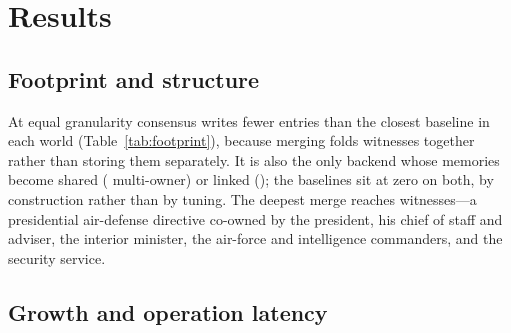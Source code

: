 \documentclass{article}
\begin{document}
\section{Results}

\subsection{Footprint and structure}
\label{sec:structure}

\begin{table}[t]
\centering
\caption{Store size by backend and world. ``Sediment'' is the store at round~0, produced by each mechanism's own ingest of the identical source events --- one row per event under consensus, one row per witness under every baseline, plus each backend's own by-products (Generative-Agents reflections, G-Memory insight nodes). ``Sim'' is what the simulation then added and is the comparison the fairness protocol licenses: all four backends atomize identically, so entry counts are comparable by construction. Structure --- what fraction of the sim entries becomes shared and linked --- is Table~\ref{tab:structuremain}.}
\label{tab:footprint}

\end{table}

\begin{table}[t]
\centering
\caption{Sharing and linking across the four worlds, consensus store. Every
baseline is at exactly 0\% on both columns in every world --- by construction,
since no baseline merges records across agents or links atoms --- so they are
stated here rather than tabulated.}
\label{tab:structuremain}

\end{table}

At equal granularity consensus writes \SaveRange{} fewer entries than the
closest baseline in each world (Table~\ref{tab:footprint}), because merging
folds witnesses together rather than storing them separately. It is also the
only backend whose memories become shared (\ShRange{} multi-owner) or linked
(\AffRange{}); the baselines sit at zero on both, by construction rather than by
tuning. The deepest merge reaches \MaxOwners{} witnesses---a presidential
air-defense directive co-owned by the president, his chief of staff and adviser,
the interior minister, the air-force and intelligence commanders, and the
security service.

\subsection{Growth and operation latency}
\label{sec:growth}
\end{document}
